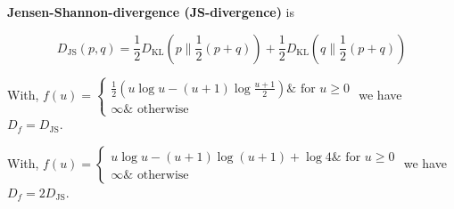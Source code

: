 \documentclass{report}
\begin{document}
\begin{definition}[12.16][JS-Divergence]
    \textbf{Jensen-Shannon-divergence (JS-divergence)} is

    $$
    D_{\mathrm{JS}}(p, q)=\frac{1}{2} D_{\mathrm{KL}}\left(p \| \frac{1}{2}(p+q)\right)+\frac{1}{2} D_{\mathrm{KL}}\left(q \| \frac{1}{2}(p+q)\right)
    $$

    With, $f(u)=\left\{\begin{array}{ll}\frac{1}{2}\left(u \log u-(u+1) \log \frac{u+1}{2}\right) \& \text { for } u \geq 0 \\ \infty \& \text { otherwise }\end{array}\right.$ we have $D_{f}=D_{\mathrm{JS}}$.

    With, $f(u)=\left\{\begin{array}{ll}u \log u-(u+1) \log (u+1)+\log 4 \& \text { for } u \geq 0 \\ \infty \& \text { otherwise }\end{array}\right.$ we have $D_{f}=2 D_{\mathrm{JS}}$.
\end{definition}
\end{document}
